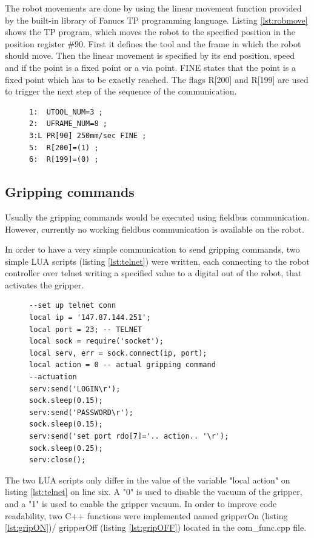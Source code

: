 The robot movements are done by using the linear movement function provided by the built-in library of Fanucs TP programming language. Listing \ref{lst:robmove} shows the TP program, which moves the robot to the specified position in the position register \#90. First it defines the tool and the frame in which the robot should move. Then the linear movement is specified by its end position, speed and if the point is a fixed point or a via point. FINE states that the point is a fixed point which has to be exactly reached. The flags R[200] and R[199] are used to trigger the next step of the sequence of the communication.
\begin{figure}[H]
\begin{lstlisting}[frame = single, caption={TP Move the robot the the specified position.}, captionpos=b, label={lst:robmove}]
1:  UTOOL_NUM=3 ;
2:  UFRAME_NUM=8 ;
3:L PR[90] 250mm/sec FINE ;
5:  R[200]=(1) ;
6:  R[199]=(0) ;
\end{lstlisting}
\end{figure}
\subsection{Gripping commands}
\label{subsec:gripcom}
Usually the gripping commands would be executed using fieldbus communication. However, currently no working fieldbus communication is available on the robot. 

In order to have a very simple communication to send gripping commands, two simple LUA scripts (listing \ref{lst:telnet}) were written, each connecting to the robot controller over telnet writing a specified value to a digital out of the robot, that activates the gripper.
\begin{figure}[H]
\begin{lstlisting}[frame = single, caption={LUA Script for telnet connection.}, captionpos=b, label={lst:telnet}]  
  --set up telnet conn
local ip = '147.87.144.251';
local port = 23; -- TELNET
local sock = require('socket');
local serv, err = sock.connect(ip, port);
local action = 0 -- actual gripping command
--actuation
serv:send('LOGIN\r');
sock.sleep(0.15);
serv:send('PASSWORD\r');
sock.sleep(0.15);
serv:send('set port rdo[7]='.. action.. '\r');
sock.sleep(0.25);
serv:close();
\end{lstlisting}
\end{figure}
The two LUA scripts only differ in the value of the variable "local action" on listing \ref{lst:telnet} on line six. A "0" is used to disable the vacuum of the gripper, and a "1" is used to enable the gripper vacuum. In order to improve code readability, two C++ functions were implemented named gripperOn (listing \ref{lst:gripON})/ gripperOff (listing \ref{lst:gripOFF}) located in the com\_func.cpp file.

